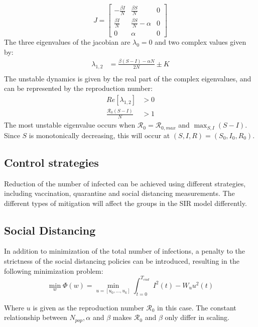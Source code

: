 \begin{equation}
    J = 
    \begin{bmatrix}
    -\frac{\beta I}{N} & \frac{\beta S}{N} & 0\\
    \frac{\beta I}{N} & \frac{\beta S}{N} - \alpha & 0 \\
    0 & \alpha & 0
    \end{bmatrix}
\end{equation}
The three eigenvalues of the jacobian are $\lambda_0 = 0$ and two complex values given by:
\begin{align}
    \lambda_{1,2} &= \frac{\beta(S-I)-\alpha N}{2N}  \pm K\\
\end{align}
The unstable dynamics is given by the real part of the complex eigenvalues, and can be represented by the reproduction number:
\begin{align}
    Re[\lambda_{1,2}] &> 0\\
    \frac{\mathscr{R}_0(S-I)}{N} &> 1
\end{align}
The most unstable eigenvalue occurs when $\mathscr{R}_0 = \mathscr{R}_{0, max}$ and $\max_{S, I} (S-I)$. Since $S$ is monotonically decreasing, this will occur at $(S, I, R) = (S_0, I_0, R_0)$.

\subsection{Control strategies}
Reduction of the number of infected can be achieved using different strategies, including vaccination, quarantine and social distancing measurements. The different types of mitigation will affect the groups in the SIR model differently.  

\subsection{Social Distancing}
In addition to minimization of the total number of infections, a penalty to the strictness of the social distancing policies can be introduced, resulting in the following minimization problem:
\begin{equation}
    \min_{w} \Phi(w) = \min_{u = [u_0, \dots, u_k]} \int_{t=0}^{T_{end}} I^2(t) - W_u u^2(t)
\end{equation}

Where $u$ is given as the reproduction number $\mathscr{R}_0$ in this case. The constant relationship between $N_{pop}, \alpha$ and $\beta$ makes $\mathscr{R}_0$ and $\beta$ only differ in scaling. 

